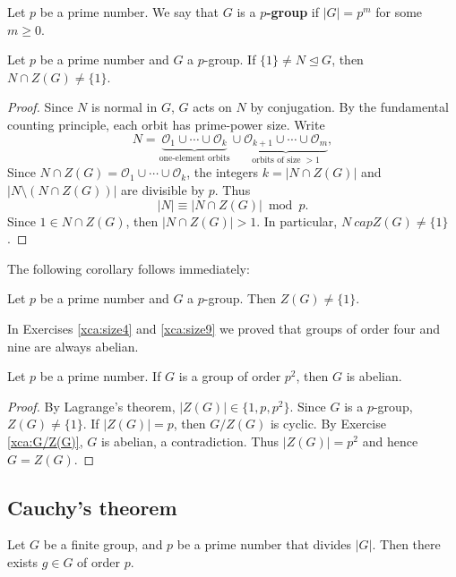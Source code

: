 \begin{definition}
Let $p$ be a prime number. We say 
that $G$ is a \textbf{$p$-group} if $|G|=p^m$ for some $m\geq0$.
\end{definition}

\begin{theorem}
Let $p$ be a prime number and 
$G$ a $p$-group. If $\{1\}\ne N\unlhd G$, then
$N\cap Z(G)\ne\{1\}$.
\end{theorem}

\begin{proof}
Since $N$ is normal in $G$, $G$ acts on $N$ by conjugation. 
By the fundamental counting principle,
each orbit has prime-power size. Write 
\[
N=\underbrace{\mathcal{O}_1\cup\cdots\cup \mathcal{O}_k}_{\text{one-element orbits}}\cup\underbrace{\mathcal{O}_{k+1}\cup\cdots\cup\mathcal{O}_m}_{\text{orbits of size $>1$}},
\]
Since $N\cap Z(G)=\mathcal{O}_1\cup\cdots\cup\mathcal{O}_k$, 
the integers $k=|N\cap Z(G)|$ and $|N\setminus(N\cap Z(G))|$ are divisible by $p$. Thus 
\[
|N|\equiv|N\cap Z(G)|\bmod p.
\]
Since $1\in N\cap Z(G)$, then
$|N\cap Z(G)|>1$. In particular, $N\
cap Z(G)\ne\{1\}$.
\end{proof}

The following corollary follows immediately: 

\begin{corollary}
Let $p$ be a prime number and 
$G$ a $p$-group. Then 
$Z(G)\ne\{1\}$.
\end{corollary}

In Exercises \ref{xca:size4} and \ref{xca:size9}
we proved that groups of order four and nine are always abelian. 

\begin{corollary}
    Let $p$ be a prime number. If $G$ is a group of order $p^2$, 
    then $G$ is abelian. 
\end{corollary}

\begin{proof}
By Lagrange's theorem, $|Z(G)|\in\{1,p,p^2\}$. Since $G$ 
is a $p$-group, $Z(G)\ne\{1\}$. If $|Z(G)|=p$, then $G/Z(G)$ 
is cyclic. By Exercise \ref{xca:G/Z(G)}, 
$G$ is abelian, a contradiction. 
Thus $|Z(G)|=p^2$ and hence $G=Z(G)$.
\end{proof}

\subsection{Cauchy's theorem}

\begin{theorem}[Cauchy]
\label{thm:Cauchy}
Let $G$ be a finite group, and $p$ be a prime number
that divides $|G|$. 
Then there exists $g\in G$ of order $p$.
\end{theorem}

